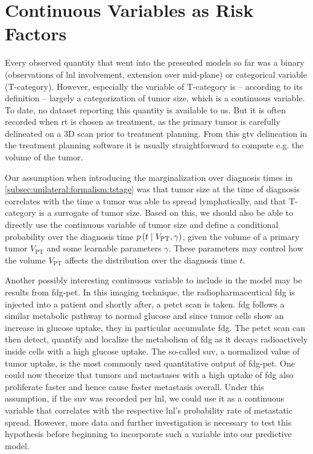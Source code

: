 \documentclass[\relativeRoot/main.tex]{subfiles}
\begin{document}
\section{Continuous Variables as Risk Factors}
\label{sec:future:continuous}

Every observed quantity that went into the presented models so far was a binary (observations of \gls{lnl} involvement, extension over mid-plane) or categorical variable (T-category). However, especially the variable of T-category is -- according to its definition \cite{brierley_tnm_2017} -- largely a categorization of tumor size, which is a continuous variable. To date, no dataset reporting this quantity is available to us. But it is often recorded when \acrlong{rt} is chosen as treatment, as the primary tumor is carefully delineated on a 3D scan prior to treatment planning. From this \gls{gtv} delineation in the treatment planning software it is usually straightforward to compute e.g. the volume of the tumor.

Our assumption when introducing the marginalization over diagnosis times in \cref{subsec:unilateral:formalism:tstage} was that tumor size at the time of diagnosis correlates with the time a tumor was able to spread lymphatically, and that T-category is a surrogate of tumor size. Based on this, we should also be able to directly use the continuous variable of tumor size and define a conditional probability over the diagnosis time $p \left( t \mid V_\text{PT}, \gamma \right)$, given the volume of a primary tumor $V_\text{PT}$ and some learnable parameters $\gamma$. These parameters may control how the volume $V_\text{PT}$ affects the distribution over the diagnosis time $t$.

Another possibly interesting continuous variable to include in the model may be results from \gls{fdg-pet}. In this imaging technique, the radiopharmaceutical \gls{fdg} is injected into a patient and shortly after, a \acrshort{pet}\acrshort{ct} scan is taken. \Gls{fdg} follows a similar metabolic pathway to normal glucose and since tumor cells show an increase in glucose uptake, they in particular accumulate \gls{fdg}. The \acrshort{pet}\acrshort{ct} scan can then detect, quantify and localize the metabolism of \gls{fdg} as it decays radioactively inside cells with a high glucose uptake. The so-called \gls{suv}, a normalized value of tumor uptake, is the most commonly used quantitative output of \gls{fdg-pet}. One could now theorize that tumors and metastases with a high uptake of \gls{fdg} also proliferate faster and hence cause faster metastasis overall. Under this assumption, if the \gls{suv} was recorded per \gls{lnl}, we could use it as a continuous variable that correlates with the respective \gls{lnl}'s probability rate of metastatic spread. However, more data and further investigation is necessary to test this hypothesis before beginning to incorporate such a variable into our predictive model.
\end{document}
